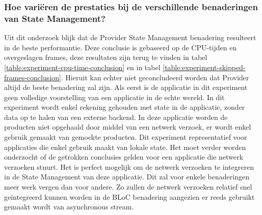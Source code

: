 \subsubsection{Hoe variëren de prestaties bij de verschillende benaderingen van State Management?}

Uit dit onderzoek blijk dat de Provider State Management benadering resulteert in de beste performantie. Deze conclusie is gebaseerd op de CPU-tijden en overgeslagen frames, deze resultaten zijn terug te vinden in tabel \ref{table:experiment-cpu-time-conclusion} en in tabel \ref{table:experiment-skipped-frames-conclusion}. Hieruit kan echter niet geconcludeerd worden dat Provider altijd de beste benadering zal zijn. \newline \newline
Als eerst is de applicatie in dit experiment geen volledige voorstelling van een applicatie in de echte wereld. In dit experiment wordt enkel rekening gehouden met state in de applicatie, zonder data op te halen van een externe backend. In deze applicatie worden de producten niet opgehaald door middel van een netwerk verzoek, er wordt enkel gebruik gemaakt van gemockte producten. Dit experiment representatief voor applicaties die enkel gebruik maakt van lokale state. Het moet verder worden onderzocht of de getrokken conclusies gelden voor een applicatie die netwerk verzoeken stuurt. \newline
Het is perfect mogelijk om de netwerk verzoeken te integreren in de State Management van deze applicatie. Dit zal voor enkele benaderingen meer werk vergen dan voor andere. Zo zullen de netwerk verzoeken relatief snel geïntegreerd kunnen worden in de BLoC benadering aangezien er reeds gebruikt gemaakt wordt van asynchronous stream. \newline 

